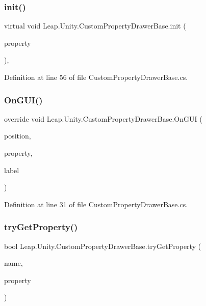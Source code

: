 \subsubsection{\texorpdfstring{init()}{init()}}
{\footnotesize\ttfamily virtual void Leap.\+Unity.\+Custom\+Property\+Drawer\+Base.\+init (\begin{DoxyParamCaption}\item[{Serialized\+Property}]{property }\end{DoxyParamCaption})\hspace{0.3cm}{\ttfamily [protected]}, {\ttfamily [virtual]}}



Definition at line 56 of file Custom\+Property\+Drawer\+Base.\+cs.

\mbox{\label{class_leap_1_1_unity_1_1_custom_property_drawer_base_a7a817930dcea770d52ef267ce720c650}} 
\subsubsection{\texorpdfstring{OnGUI()}{OnGUI()}}
{\footnotesize\ttfamily override void Leap.\+Unity.\+Custom\+Property\+Drawer\+Base.\+On\+G\+UI (\begin{DoxyParamCaption}\item[{Rect}]{position,  }\item[{Serialized\+Property}]{property,  }\item[{G\+U\+I\+Content}]{label }\end{DoxyParamCaption})}



Definition at line 31 of file Custom\+Property\+Drawer\+Base.\+cs.

\mbox{\label{class_leap_1_1_unity_1_1_custom_property_drawer_base_a9a48ff6212e10ab69a24c538226a8466}} 
\subsubsection{\texorpdfstring{tryGetProperty()}{tryGetProperty()}}
{\footnotesize\ttfamily bool Leap.\+Unity.\+Custom\+Property\+Drawer\+Base.\+try\+Get\+Property (\begin{DoxyParamCaption}\item[{string}]{name,  }\item[{out Serialized\+Property}]{property }\end{DoxyParamCaption})\hspace{0.3cm}{\ttfamily [protected]}}



